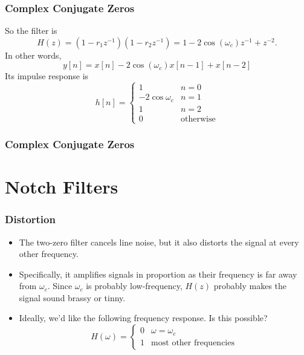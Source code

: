 \documentclass{beamer}
\begin{document}
\begin{frame}
  \frametitle{Complex Conjugate Zeros}
  
  So the filter is 
  \begin{displaymath}
    H(z) = (1-r_1z^{-1})(1-r_2z^{-1}) = 1-2\cos(\omega_c) z^{-1} + z^{-2}.
  \end{displaymath}
  In other words,
  \begin{displaymath}
    y[n] = x[n] - 2\cos(\omega_c)x[n-1] + x[n-2]
  \end{displaymath}
  Its impulse response is
  \begin{displaymath}
    h[n]=\begin{cases}
    1 & n=0\\
    -2\cos\omega_c & n=1\\
    1 & n=2\\
    0 & \mbox{otherwise}
    \end{cases}
  \end{displaymath}
\end{frame}

\begin{frame}
  \frametitle{Complex Conjugate Zeros}
  \centerline{}
\end{frame}  

\section[Notch Filters]{Notch Filters}
\setcounter{subsection}{1}

\begin{frame}
  \frametitle{Distortion}

  \begin{itemize}
    \item The two-zero filter cancels line noise, but it also distorts the
      signal at every other frequency.
    \item Specifically, it amplifies signals in proportion as their
      frequency is far away from $\omega_c$.  Since $\omega_c$ is probably
      low-frequency, $H(z)$ probably makes the signal sound brassy or tinny.
    \item Ideally, we'd like the following frequency response.  Is this possible?
      \begin{displaymath}
        H(\omega) = \begin{cases}
          0 & \omega=\omega_c \\
          1 & \mbox{most other frequencies}
        \end{cases}
      \end{displaymath}
  \end{itemize}
\end{frame}
\end{document}
